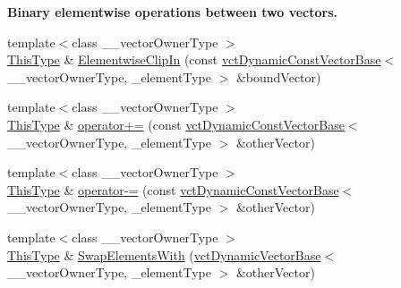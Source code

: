 \begin{Indent}{\bf Binary elementwise operations between two vectors.}
\begin{DoxyCompactItemize}
{\footnotesize template$<$class \-\_\-\-\_\-vector\-Owner\-Type $>$ }\\\hyperlink{classvct_dynamic_const_vector_base_a39da273523717f678f54d3321ebca3dd}{This\-Type} \& \hyperlink{classvct_dynamic_vector_base_a34ebdb5ea47bb05882b5db91c1a4987a}{Elementwise\-Clip\-In} (const \hyperlink{classvct_dynamic_const_vector_base}{vct\-Dynamic\-Const\-Vector\-Base}$<$ \-\_\-\-\_\-vector\-Owner\-Type, \-\_\-element\-Type $>$ \&bound\-Vector)
\item 
{\footnotesize template$<$class \-\_\-\-\_\-vector\-Owner\-Type $>$ }\\\hyperlink{classvct_dynamic_const_vector_base_a39da273523717f678f54d3321ebca3dd}{This\-Type} \& \hyperlink{classvct_dynamic_vector_base_ac2f6969f2446d396f892de7345b179c5}{operator+=} (const \hyperlink{classvct_dynamic_const_vector_base}{vct\-Dynamic\-Const\-Vector\-Base}$<$ \-\_\-\-\_\-vector\-Owner\-Type, \-\_\-element\-Type $>$ \&other\-Vector)
\item 
{\footnotesize template$<$class \-\_\-\-\_\-vector\-Owner\-Type $>$ }\\\hyperlink{classvct_dynamic_const_vector_base_a39da273523717f678f54d3321ebca3dd}{This\-Type} \& \hyperlink{classvct_dynamic_vector_base_abf61f9e3ee6622ab355b8b34f0fceace}{operator-\/=} (const \hyperlink{classvct_dynamic_const_vector_base}{vct\-Dynamic\-Const\-Vector\-Base}$<$ \-\_\-\-\_\-vector\-Owner\-Type, \-\_\-element\-Type $>$ \&other\-Vector)
\item 
{\footnotesize template$<$class \-\_\-\-\_\-vector\-Owner\-Type $>$ }\\\hyperlink{classvct_dynamic_const_vector_base_a39da273523717f678f54d3321ebca3dd}{This\-Type} \& \hyperlink{classvct_dynamic_vector_base_aa18ec9599ba05be407f344ee33085188}{Swap\-Elements\-With} (\hyperlink{classvct_dynamic_vector_base}{vct\-Dynamic\-Vector\-Base}$<$ \-\_\-\-\_\-vector\-Owner\-Type, \-\_\-element\-Type $>$ \&other\-Vector)
\end{DoxyCompactItemize}
\end{Indent}
